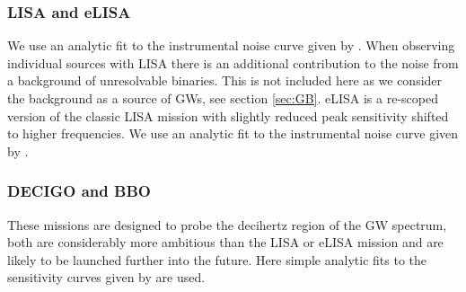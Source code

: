 \documentclass[fleqn,12pt]{iopart}
\begin{document}
\subsubsection{LISA and eLISA}
We use an analytic fit to the instrumental noise curve given by \citet{Sathyaprakash2009}. When observing individual sources with LISA there is an additional contribution to the noise from a background of unresolvable binaries. This is not included here as we consider the background as a source of GWs, see section \ref{sec:GB}. eLISA is a re-scoped version of the classic LISA mission with slightly reduced peak sensitivity shifted to higher frequencies. We use an analytic fit to the instrumental noise curve given by \citet{Amaro-Seoane2012}.

\subsubsection{DECIGO and BBO}
These missions are designed to probe the decihertz region of the GW spectrum, both are considerably more ambitious than the LISA or eLISA mission and are likely to be launched further into the future. Here simple analytic fits to the sensitivity curves given by \citet{Yagi2011a} are used.
\end{document}
